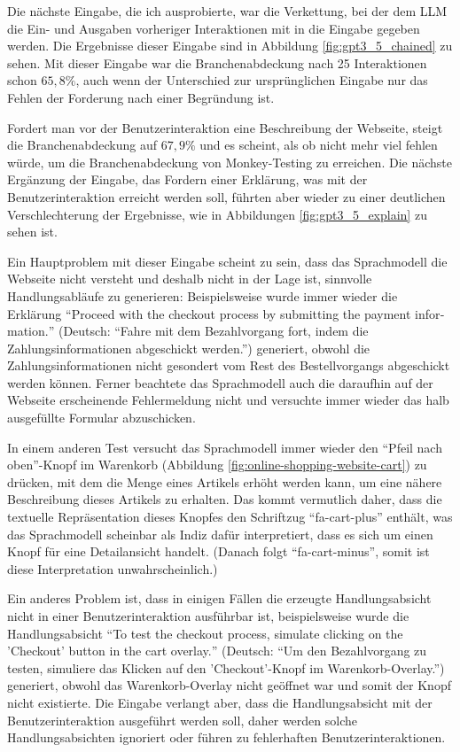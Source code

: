 Die nächste Eingabe, die ich ausprobierte, war die Verkettung, bei der dem LLM die Ein- und Ausgaben vorheriger Interaktionen mit in die Eingabe gegeben werden.
Die Ergebnisse dieser Eingabe sind in Abbildung \ref{fig:gpt3_5_chained} zu sehen.
Mit dieser Eingabe war die Branchenabdeckung nach 25 Interaktionen schon $65,8\%$, auch wenn der Unterschied zur ursprünglichen Eingabe nur das Fehlen der Forderung nach einer Begründung ist.

Fordert man vor der Benutzerinteraktion eine Beschreibung der Webseite, steigt die Branchenabdeckung auf $67,9\%$ und es scheint, als ob nicht mehr viel fehlen würde, um die Branchenabdeckung von Monkey-Testing zu erreichen.
Die nächste Ergänzung der Eingabe, das Fordern einer Erklärung, was mit der Benutzerinteraktion erreicht werden soll, führten aber wieder zu einer deutlichen Verschlechterung der Ergebnisse, wie in Abbildungen \ref{fig:gpt3_5_explain} zu sehen ist.

Ein Hauptproblem mit dieser Eingabe scheint zu sein, dass das Sprachmodell die Webseite nicht versteht und deshalb nicht in der Lage ist, sinnvolle Handlungsabläufe zu generieren:
Beispielsweise wurde immer wieder die Erklärung \enquote{\foreignlanguage{english}{Proceed with the checkout process by submitting the payment information.}} (Deutsch: \enquote{Fahre mit dem Bezahlvorgang fort, indem die Zahlungsinformationen abgeschickt werden.}) generiert, obwohl die Zahlungsinformationen nicht gesondert vom Rest des Bestellvorgangs abgeschickt werden können.
Ferner beachtete das Sprachmodell auch die daraufhin auf der Webseite erscheinende Fehlermeldung nicht und versuchte immer wieder das halb ausgefüllte Formular abzuschicken.

In einem anderen Test versucht das Sprachmodell immer wieder den \enquote{Pfeil nach oben}-Knopf im Warenkorb (Abbildung \ref{fig:online-shopping-website-cart}) zu drücken, mit dem die Menge eines Artikels erhöht werden kann, um eine nähere Beschreibung dieses Artikels zu erhalten.
Das kommt vermutlich daher, dass die textuelle Repräsentation dieses Knopfes den Schriftzug \enquote{fa-cart-plus} enthält, was das Sprachmodell scheinbar als Indiz dafür interpretiert, dass es sich um einen Knopf für eine Detailansicht handelt.
(Danach folgt \enquote{fa-cart-minus}, somit ist diese Interpretation unwahrscheinlich.)

Ein anderes Problem ist, dass in einigen Fällen die erzeugte Handlungsabsicht nicht in einer Benutzerinteraktion ausführbar ist, beispielsweise wurde die Handlungsabsicht \enquote{\foreignlanguage{english}{To test the checkout process, simulate clicking on the 'Checkout' button in the cart overlay.}} (Deutsch: \enquote{Um den Bezahlvorgang zu testen, simuliere das Klicken auf den 'Checkout'-Knopf im Warenkorb-Overlay.}) generiert, obwohl das Warenkorb-Overlay nicht geöffnet war und somit der Knopf nicht existierte.
Die Eingabe verlangt aber, dass die Handlungsabsicht mit der Benutzerinteraktion ausgeführt werden soll, daher werden solche Handlungsabsichten ignoriert oder führen zu fehlerhaften Benutzerinteraktionen.

